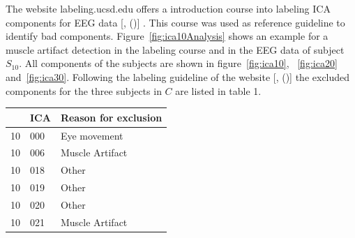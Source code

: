 \documentclass[a4paper]{article}
\newcommand{\pcaay}[2][]{
[\citeauthor{#2}, (\citeyear[#1]{#2})]\xspace
}
\begin{document}
The website labeling.ucsd.edu offers a introduction course into labeling ICA components for EEG data\pcaay{pion-tonachini}.
This course was used as reference guideline to identify bad components.
Figure~\ref{fig:ica10Analysis} shows an example for a muscle artifact detection in the labeling course and in the EEG data of subject $S_{10}$.
All components of the subjects are shown in figure~\ref{fig:ica10}, ~\ref{fig:ica20} and~\ref{fig:ica30}.
Following the labeling guideline of the website \pcaay{pion-tonachini} the excluded components for the three subjects in $C$ are listed in table 1.

\begin{table}[]
\centering
\begin{tabular}{|l|l|l|}
\hline
\rowcolor[HTML]{9B9B9B} 
\multicolumn{1}{|c|}{\cellcolor[HTML]{9B9B9B}\textbf{Subject}} & \multicolumn{1}{c|}{\cellcolor[HTML]{9B9B9B}\textbf{ICA}} & \multicolumn{1}{c|}{\cellcolor[HTML]{9B9B9B}\textbf{Reason for exclusion}} \\ \hline
10                                                             & 000                                                       & Eye movement                                                               \\ \hline
10                                                             & 006                                                       & Muscle Artifact                                                            \\ \hline
10                                                             & 018                                                       & Other                                                                      \\ \hline
10                                                             & 019                                                       & Other                                                                      \\ \hline
10                                                             & 020                                                       & Other                                                                      \\ \hline
10                                                             & 021                                                       & Muscle Artifact                                                                      \\ \hline

\end{tabular}
\end{table}
\end{document}
